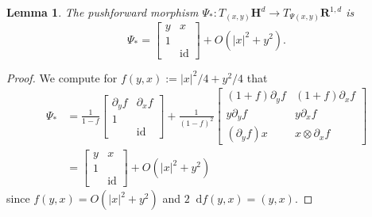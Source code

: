 \documentclass[reqno,10pt]{amsart}
\newcommand{\RR}{\mathbf{R}}
\newcommand{\Hyp}{\mathbf H}
\DeclareMathOperator{\id}{id}
\newcommand*\dif{\mathop{}\!\mathrm{d}}
\newtheorem{lemma}[theorem]{Lemma}
\theoremstyle{definition}
\numberwithin{equation}{section}
\begin{document}
\begin{lemma}
The pushforward morphism $\Psi_*: T_{(x, y)} \Hyp^d \to T_{\Psi(x, y)} \RR^{1, d}$ is
\begin{equation}\label{pushforward estimates}
\Psi_* = \begin{bmatrix}y & x \\ 1 \\ & \id \end{bmatrix} + O(|x|^2 + y^2).
\end{equation}
\end{lemma}
\begin{proof}
We compute for $f(y, x) := |x|^2/4 + y^2/4$ that
\begin{align*}
\Psi_* &= \frac{1}{1 - f} \begin{bmatrix} \partial_y f & \partial_x f \\ 1 \\ & \id \end{bmatrix} + \frac{1}{(1 - f)^2} \begin{bmatrix}(1 + f) \partial_y f & (1 + f) \partial_x f \\
y \partial_y f & y \partial_x f \\
(\partial_y f) x & x \otimes \partial_x f
\end{bmatrix} \\
&= \begin{bmatrix}y & x \\ 1 \\ & \id \end{bmatrix} + O(|x|^2 + y^2)
\end{align*}
since $f(y, x) = O(|x|^2 + y^2)$ and $2\dif f(y, x) = (y, x)$.
\end{proof}
\end{document}
